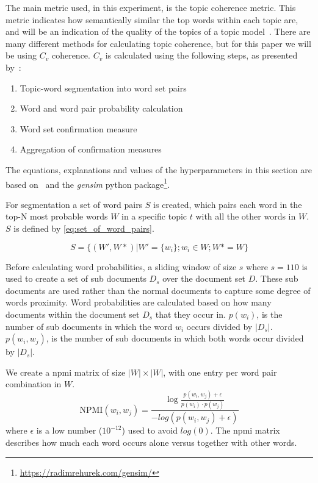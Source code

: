 The main metric used, in this experiment, is the topic coherence metric.
This metric indicates how semantically similar the top words within each topic are, and will be an indication of the quality of the topics of a topic model~\cite{topic_coherence_2015}.
There are many different methods for calculating topic coherence, but for this paper we will be using $C_v$ coherence.
$C_v$ is calculated using the following steps, as presented by~\citet{Syed2017coherence}:
\begin{enumerate}
	\item Topic-word segmentation into word set pairs
	\item Word and word pair probability calculation
	\item Word set confirmation measure
	\item Aggregation of confirmation measures
\end{enumerate}
The equations, explanations and values of the hyperparameters in this section are based on~\citet{Syed2017coherence} and the \textit{gensim} python package\footnote{\url{https://radimrehurek.com/gensim/}}.

For segmentation a set of word pairs $S$ is created, which pairs each word in the top-N most probable words $W$ in a specific topic $t$ with all the other words in $W$.
$S$ is defined by \autoref{eq:set_of_word_pairs}.

\begin{equation}\label{eq:set_of_word_pairs}
	S = \{(W', W*)|W' = \{w_i\};w_i \in W;W* = W\}
\end{equation}

Before calculating word probabilities, a sliding window of size $s$ where $s =110$ is used to create a set of sub documents $D_s$ over the document set $D$.
These sub documents are used rather than the normal documents to capture some degree of words proximity.
Word probabilities are calculated based on how many documents within the document set $D_s$ that they occur in.
$p(w_i)$, is the number of sub documents in which the word $w_i$ occurs divided by $|D_s|$.
$p(w_i, w_j)$, is the number of sub documents in which both words occur divided by $|D_s|$. 

We create a \gls{npmi} matrix of size $|W|\times|W|$, with one entry per word pair combination in $W$.
\begin{equation}\label{eq:coherence_2}
	\text{NPMI}(w_i,w_j) =  \frac{\log\frac{p(w_i,w_j) + \epsilon}{p(w_i)\cdot p(w_j)}}{-log(p(w_i,w_j) + \epsilon)}
\end{equation}
\noindent where $\epsilon$ is a low number ($10^{-12}$) used to avoid $log(0)$.
The \gls{npmi} matrix describes how much each word occurs alone versus together with other words.

